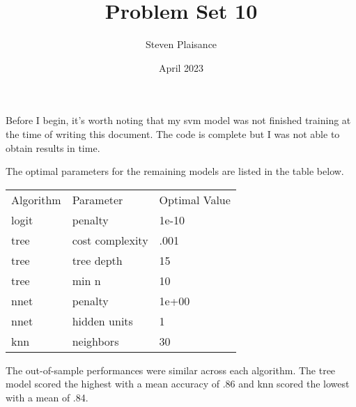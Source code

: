 \documentclass{article}
\title{Problem Set 10}
\author{Steven Plaisance}
\date{April 2023}
\begin{document}
\maketitle

Before I begin, it's worth noting that my svm model was not finished training at the time of writing this document. The code is complete but I was not able to obtain results in time.

The optimal parameters for the remaining models are listed in the table below. 
\begin{table}[]
\begin{tabular}{lll}
Algorithm & Parameter       & Optimal Value \\
logit     & penalty         & 1e-10         \\
tree      & cost complexity & .001          \\
tree      & tree depth      & 15            \\
tree      & min n           & 10            \\
nnet      & penalty         & 1e+00         \\
nnet      & hidden units    & 1             \\
knn       & neighbors       & 30           
\end{tabular}
\end{table}

The out-of-sample performances were similar across each algorithm. The tree model scored the highest with a mean accuracy of .86 and knn scored the lowest with a mean of .84. 
\end{document}
